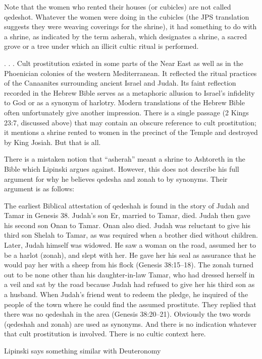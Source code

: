 \documentclass[11pt]{article}
\begin{document}
{Note that the women who rented their houses (or cubicles) are not called qedeshot. Whatever the women were doing in the cubicles (the JPS translation suggests they were weaving coverings for the shrine), it had something to do with a shrine, as indicated by the term asherah, which designates a shrine, a sacred grove or a tree under which an illicit cultic ritual is performed.

. . . 
Cult prostitution existed in some parts of the Near East as well as in the Phoenician colonies of the western Mediterranean. It reflected the ritual practices of the Canaanites surrounding ancient Israel and Judah. Its faint reflection recorded in the Hebrew Bible serves as a metaphoric allusion to Israel’s infidelity to God or as a synonym of harlotry. Modern translations of the Hebrew Bible often unfortunately give another impression. There is a single passage (2 Kings 23:7, discussed above) that may contain an obscure reference to cult prostitution; it mentions a shrine rented to women in the precinct of the Temple and destroyed by King Josiah. But that is all.

There is a mistaken notion that “asherah” meant a shrine to Ashtoreth in the Bible which Lipinski argues against. However, this does not describe his full argument for why he believes qedesha and zonah to by synonyms. Their argument is as follows:

The earliest Biblical attestation of qedeshah is found in the story of Judah and Tamar in Genesis 38. Judah’s son Er, married to Tamar, died. Judah then gave his second son Onan to Tamar. Onan also died. Judah was reluctant to give his third son Shelah to Tamar, as was required when a brother died without children. Later, Judah himself was widowed. He saw a woman on the road, assumed her to be a harlot (zonah), and slept with her. He gave her his seal as assurance that he would pay her with a sheep from his flock (Genesis 38:15–18). The zonah turned out to be none other than his daughter-in-law Tamar, who had dressed herself in a veil and sat by the road because Judah had refused to give her his third son as a husband. When Judah’s friend went to redeem the pledge, he inquired of the people of the town where he could find the assumed prostitute. They replied that there was no qedeshah in the area (Genesis 38:20–21). Obviously the two words (qedeshah and zonah) are used as synonyms. And there is no indication whatever that cult prostitution is involved. There is no cultic context here.

Lipinski says something similar with Deuteronomy

}
\end{document}
